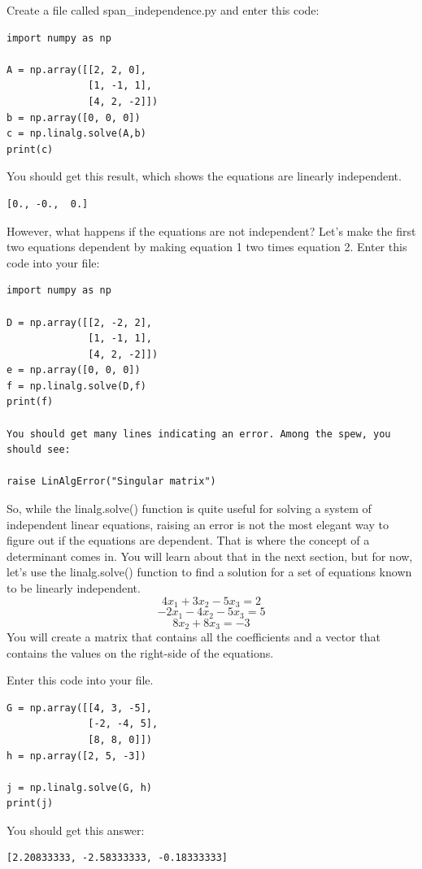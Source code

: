 Create a file called span\_independence.py and enter this code:
\begin{verbatim}
import numpy as np

A = np.array([[2, 2, 0], 
              [1, -1, 1],
              [4, 2, -2]])
b = np.array([0, 0, 0])
c = np.linalg.solve(A,b)
print(c)
\end{verbatim}
You should get this result, which shows the equations are linearly independent.
\begin{verbatim}
[0., -0.,  0.]
\end{verbatim}
However, what happens if the equations are not independent? Let's make the 
first two equations dependent by making equation 1 two times equation 2. Enter 
this code into your file:
\begin{verbatim}
import numpy as np

D = np.array([[2, -2, 2], 
              [1, -1, 1],
              [4, 2, -2]])
e = np.array([0, 0, 0])
f = np.linalg.solve(D,f)
print(f)

You should get many lines indicating an error. Among the spew, you should see:

raise LinAlgError("Singular matrix")
\end{verbatim}
So, while the linalg.solve() function is quite useful for solving a system of 
independent linear equations, raising an error is not the most elegant way to 
figure out if the equations are dependent. That is where the concept of a 
determinant comes in. You will learn about that in the next section, but for 
now, let's use the  linalg.solve() function to find a solution for a set of 
equations known to be linearly independent.
$$4x_1 + 3x_2 - 5x_3 = 2$$
$$-2x_1- 4x_2 - 5x_3 = 5$$
$$       8x_2 + 8x_3  = -3$$
You will create a matrix that contains all the coefficients and a vector that 
contains the values on the right-side of the equations. 

Enter this code into your file. 
\begin{verbatim}
G = np.array([[4, 3, -5], 
              [-2, -4, 5], 
              [8, 8, 0]])
h = np.array([2, 5, -3])

j = np.linalg.solve(G, h)
print(j)
\end{verbatim}
You should get this answer:
\begin{verbatim}
[2.20833333, -2.58333333, -0.18333333]
\end{verbatim}

